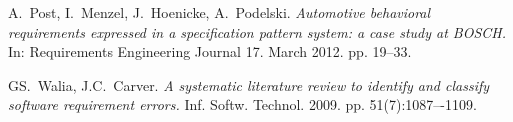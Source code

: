 \documentclass[conference]{IEEEtran}
\begin{document}
\begin{thebibliography}{1}
A.~Post, I.~Menzel, J.~Hoenicke, A.~Podelski. \emph{Automotive behavioral requirements expressed in a specification pattern system: a case study at BOSCH.} In: Requirements Engineering Journal 17. March 2012. pp. 19--33.


GS.~Walia, J.C.~Carver. \emph{A systematic literature review to identify and classify software requirement errors.} Inf. Softw. Technol. 2009. pp. 51(7):1087–-1109.

\end{thebibliography}

\end{document}
